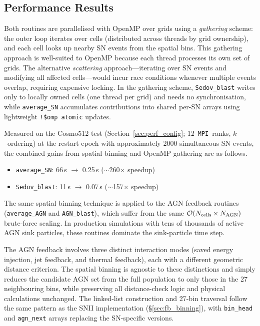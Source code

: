 \documentclass[fleqn,usenatbib]{mnras}
\newcommand{\ksec}{\ensuremath{k}\text{-section}}
\newcommand{\Olog}[1]{\mathcal{O}(#1)}
\newcommand{\code}[1]{\texttt{#1}}
\newcommand{\mpi}[0]{\texttt{MPI}}
\begin{document}
\subsection{Performance Results}
\label{sec:fb_performance}

Both routines are parallelised with OpenMP over grids using a
\emph{gathering} scheme: the outer loop iterates over cells
(distributed across threads by grid ownership), and each cell looks
up nearby SN events from the spatial bins.  This gathering approach
is well-suited to OpenMP because each thread processes its own set
of grids.  The alternative \emph{scattering} approach---iterating
over SN events and modifying all affected cells---would incur race
conditions whenever multiple events overlap, requiring expensive
locking.  In the gathering scheme, \code{Sedov\_blast} writes only
to locally owned cells (one thread per grid) and needs no
synchronisation, while \code{average\_SN} accumulates contributions
into shared per-SN arrays using lightweight \code{!\$omp atomic}
updates.

Measured on the Cosmo512 test (Section~\ref{sec:perf_config};
12~\mpi\ ranks, \ksec\ ordering) at the restart epoch with
approximately 2000 simultaneous SN events, the combined gains from
spatial binning and OpenMP gathering are as follows.
\begin{itemize}
\item \code{average\_SN}: 66\,s $\rightarrow$ 0.25\,s
  ($\sim$260$\times$ speedup)
\item \code{Sedov\_blast}: 11\,s $\rightarrow$ 0.07\,s
  ($\sim$157$\times$ speedup)
\end{itemize}

The same spatial binning technique is applied to the AGN feedback
routines (\code{average\_AGN} and \code{AGN\_blast}), which suffer
from the same $\Olog{N_{\rm cells} \times N_{\rm AGN}}$ brute-force
scaling. In production simulations with tens of thousands of active
AGN sink particles, these routines dominate the sink-particle time
step.

The AGN feedback involves three distinct interaction modes (saved
energy injection, jet feedback, and thermal feedback), each with a
different geometric distance criterion. The spatial binning is
agnostic to these distinctions and simply reduces the candidate AGN set from
the full population to only those in the 27 neighbouring bins, while
preserving all distance-check logic and physical calculations
unchanged. The linked-list construction and 27-bin traversal follow
the same pattern as the SNII implementation
(\S\ref{sec:fb_binning}), with \code{bin\_head} and \code{agn\_next}
arrays replacing the SN-specific versions.
\end{document}
